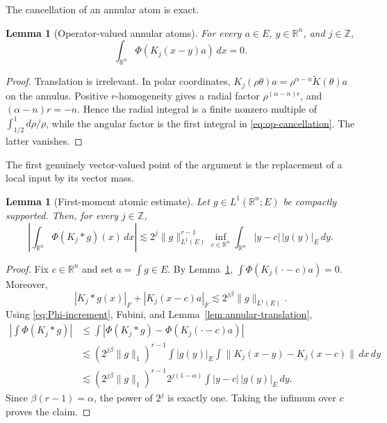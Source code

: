 \documentclass[11pt]{amsart}
\numberwithin{equation}{section}
\newtheorem{lemma}[theorem]{Lemma}
\theoremstyle{definition}
\theoremstyle{remark}
\newcommand{\R}{\mathbb R}
\newcommand{\norm}[1]{\lVert #1\rVert}
\begin{document}
The cancellation of an annular atom is exact.

\begin{lemma}[Operator-valued annular atoms]\label{lem:annular-atoms}
For every $a\in E$, $y\in\R^n$, and $j\in\mathbb Z$,
\begin{equation}\label{eq:annular-atom}
 \int_{\R^n}\Phi(K_j(x-y)a)\,dx=0.
\end{equation}
\end{lemma}

\begin{proof}
Translation is irrelevant.  In polar coordinates,
$K_j(\rho\theta)a=\rho^{\alpha-n}\widetilde K(\theta)a$ on the annulus.
Positive $r$-homogeneity gives a radial factor
$\rho^{(\alpha-n)r}$, and $(\alpha-n)r=-n$.  Hence the radial integral is a
finite nonzero multiple of $\int_{1/2}^1d\rho/\rho$, while the angular factor
is the first integral in \eqref{eq:op-cancellation}.  The latter vanishes.
\end{proof}

The first genuinely vector-valued point of the argument is the replacement of
a local input by its vector mass.

\begin{lemma}[First-moment atomic estimate]\label{lem:first-moment-atom}
Let $g\in L^1(\R^n;E)$ be compactly supported.  Then, for every
$j\in\mathbb Z$,
\begin{equation}\label{eq:first-moment-atom}
 \left|\int_{\R^n}\Phi(K_j*g)(x)\,dx\right|
 \lesssim
 2^j\norm{g}_{L^1(E)}^{r-1}
 \inf_{c\in\R^n}\int_{\R^n}|y-c|\,|g(y)|_E\,dy.
\end{equation}
\end{lemma}

\begin{proof}
Fix $c\in\R^n$ and set $a=\int g\in E$.  By
Lemma~\ref{lem:annular-atoms},
$\int\Phi(K_j(\cdot-c)a)=0$.  Moreover,
\[
 |K_j*g(x)|_F+|K_j(x-c)a|_F
 \lesssim2^{j\beta}\norm g_{L^1(E)}.
\]
Using \eqref{eq:Phi-increment}, Fubini, and
Lemma~\ref{lem:annular-translation},
\begin{align*}
 \left|\int\Phi(K_j*g)\right|
 &\le \int\left|\Phi(K_j*g)-\Phi(K_j(\cdot-c)a)\right|\\
 &\lesssim
 (2^{j\beta}\norm g_1)^{r-1}
 \int |g(y)|_E
 \int\norm{K_j(x-y)-K_j(x-c)}\,dx\,dy\\
 &\lesssim
 (2^{j\beta}\norm g_1)^{r-1}
 2^{j(1-\alpha)}
 \int |y-c|\,|g(y)|_E\,dy.
\end{align*}
Since $\beta(r-1)=\alpha$, the power of $2^j$ is exactly one.  Taking the
infimum over $c$ proves the claim.
\end{proof}
\end{document}
